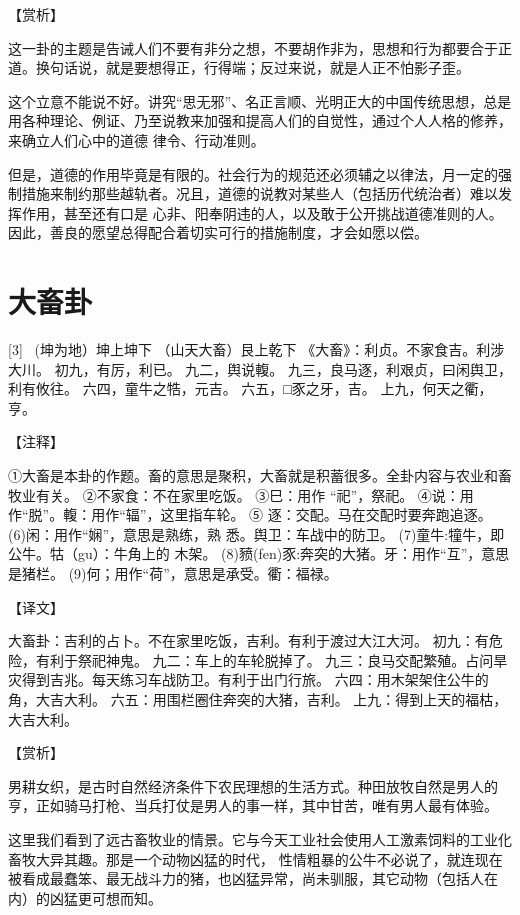 \documentclass[12pt,UTF8]{ctexbook}
\begin{document}
【赏析】

这一卦的主题是告诫人们不要有非分之想，不要胡作非为，思想和行为都要合于正道。换句话说，就是要想得正，行得端；反过来说，就是人正不怕影子歪。

这个立意不能说不好。讲究“思无邪”、名正言顺、光明正大的中国传统思想，总是用各种理论、例证、乃至说教来加强和提高人们的自觉性，通过个人人格的修养，来确立人们心中的道德 律令、行动准则。

但是，道德的作用毕竟是有限的。社会行为的规范还必须辅之以律法，月一定的强制措施来制约那些越轨者。况且，道德的说教对某些人（包括历代统治者）难以发挥作用，甚至还有口是 心非、阳奉阴违的人，以及敢于公开挑战道德准则的人。因此，善良的愿望总得配合着切实可行的措施制度，才会如愿以偿。

\chapter{大畜卦}
[3] \ (坤为地）坤上坤下
（山天大畜）艮上乾下
《大畜》：利贞。不家食吉。利涉大川。
初九，有厉，利已。
九二，舆说輹。
九三，良马逐，利艰贞，曰闲舆卫，利有攸往。
六四，童牛之牿，元吉。
六五，□豕之牙，吉。
上九，何天之衢，亨。

【注释】

①大畜是本卦的作题。畜的意思是聚积，大畜就是积蓄很多。全卦内容与农业和畜牧业有关。
②不家食：不在家里吃饭。
③巳：用作 “祀”，祭祀。
④说：用作“脱”。輹：用作“辐”，这里指车轮。
⑤ 逐：交配。马在交配时要奔跑追逐。
(6)闲：用作“娴”，意思是熟练，熟 悉。舆卫：车战中的防卫。
(7)童牛:犝牛，即公牛。牯（gu）：牛角上的 木架。
(8)豮(fen)豕:奔突的大猪。牙：用作“互”，意思是猪栏。
(9)何；用作“荷”，意思是承受。衢：福禄。

【译文】

大畜卦：吉利的占卜。不在家里吃饭，吉利。有利于渡过大江大河。
初九：有危险，有利于祭祀神鬼。
九二：车上的车轮脱掉了。
九三：良马交配繁殖。占问旱灾得到吉兆。每天练习车战防卫。有利于出门行旅。
六四：用木架架住公牛的角，大吉大利。
六五：用围栏圈住奔突的大猪，吉利。
上九：得到上天的福枯，大吉大利。

【赏析】

男耕女织，是古时自然经济条件下农民理想的生活方式。种田放牧自然是男人的亨，正如骑马打枪、当兵打仗是男人的事一样，其中甘苦，唯有男人最有体验。

这里我们看到了远古畜牧业的情景。它与今天工业社会使用人工激素饲料的工业化畜牧大异其趣。那是一个动物凶猛的时代， 性情粗暴的公牛不必说了，就连现在被看成最蠢笨、最无战斗力的猪，也凶猛异常，尚未驯服，其它动物（包括人在内）的凶猛更可想而知。
\end{document}
